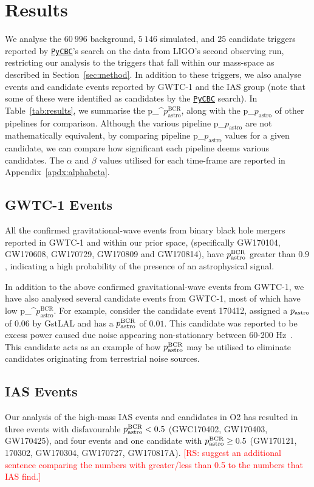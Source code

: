 \documentclass[%
 nofootinbib,
 amsmath,amssymb,
 aps,
 twocolumn
]{revtex4-2}
\newcommand{\gstlal}{{\sc GstLAL}\xspace}
\newcommand{\pycbc}{{\sc \href{https://pycbc.org/}{\texttt{PyCBC}}}\xspace}
\newcommand{\fancytext}[1]{{\relax\ifmmode#1\else $#1$\fi}\xspace}
\newcommand{\pastro}{\fancytext{p_\text{astro}}}
\newcommand{\pastrobcr}{\fancytext{p_\text{astro}^{\text{BCR}}}}
\newcommand{\rs}[1]{\textcolor{red}{[RS: #1]}}
\begin{document}
\section{\label{sec:Results}Results}


We analyse the $60\ 996$ background, $5\ 146$ simulated, and $25$ candidate triggers reported by \pycbc's search on the data from LIGO's second observing run, restricting our analysis to the triggers that fall within our mass-space as described in Section~\ref{sec:method}. In addition to these triggers, we also analyse events and candidate events reported by GWTC-1 and the IAS group (note that some of these were identified as candidates by the \pycbc search). In Table~\ref{tab:results}, we summarise the \pastrobcr, along with the \pastro of other pipelines for comparison. Although the various pipeline \pastro are not mathematically equivalent, by comparing pipeline \pastro values for a given candidate, we can compare how significant each pipeline deems various candidates. The $\alpha$ and $\beta$ values utilised for each time-frame are reported in Appendix~\ref{apdx:alphabeta}.

\subsection{GWTC-1 Events}
All the confirmed gravitational-wave events from binary black hole mergers reported in GWTC-1 and within our prior space, (specifically GW170104, GW170608, GW170729, GW170809 and GW170814), have $\pastrobcr$ greater than $0.9$, indicating a high probability of the presence of an astrophysical signal. 

In addition to the above confirmed gravitational-wave events from GWTC-1, we have also analysed several candidate events from GWTC-1, most of which have low \pastrobcr. For example, consider the candidate event 170412, assigned a $\pastro$ of $0.06$ by \gstlal and has a $\pastrobcr$ of $0.01$. This candidate was reported to be excess power caused due noise appearing non-stationary between 60-200 Hz~\cite{GWTC1}. This candidate acts as an example of how $\pastrobcr$ may be utilised to eliminate candidates originating from terrestrial noise sources.

\subsection{IAS Events}
Our analysis of the high-mass IAS events and candidates in O2 has resulted in three events with disfavourable $\pastrobcr<0.5$ (GWC170402, GW170403, GW170425), and four events and one candidate with $\pastrobcr\geq0.5$ (GW170121, 170302, GW170304, GW170727, GW170817A). \rs{suggest an additional sentence comparing the numbers with greater/less than 0.5 to the numbers that IAS find.}
\end{document}
